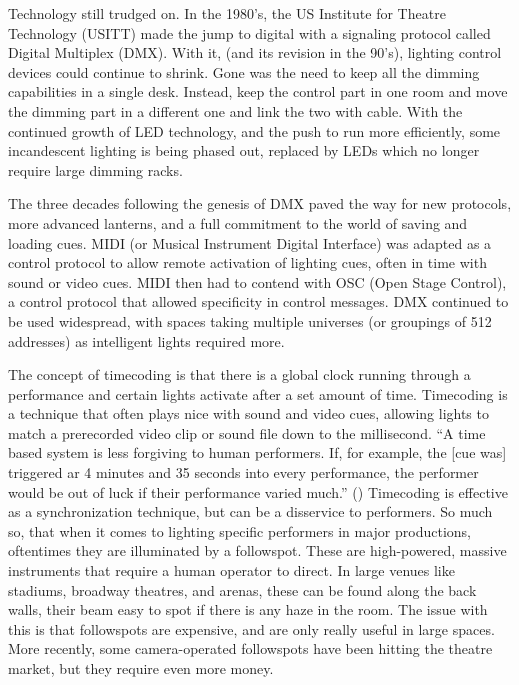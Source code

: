 \documentclass[
    12pt,
    twoside,
    bibstyle=chicago,
    headerstyle=uppercase,
	bibfile=thesis.bib
]{reedthesis}
\begin{document}
Technology still trudged on. In the 1980's, the US Institute for Theatre Technology (USITT) made the jump to digital with a signaling protocol called Digital Multiplex (DMX). With it, (and its revision in the 90's), lighting control devices could continue to shrink. Gone was the need to keep all the dimming capabilities in a single desk. Instead, keep the control part in one room and move the dimming part in a different one and link the two with cable. With the continued growth of LED technology, and the push to run more efficiently, some incandescent lighting is being phased out, replaced by LEDs which no longer require large dimming racks. 

	The three decades following the genesis of DMX paved the way for new protocols, more advanced lanterns, and a full commitment to the world of saving and loading cues. MIDI (or Musical Instrument Digital Interface) was adapted as a control protocol to allow remote activation of lighting cues, often in time with sound or video cues. MIDI then had to contend with OSC (Open Stage Control), a control protocol that allowed specificity in control messages. DMX continued to be used widespread, with spaces taking multiple universes (or groupings of 512 addresses) as intelligent lights required more.
	 
	The concept of timecoding is that there is a global clock running through a performance and certain lights activate after a set amount of time. Timecoding is a technique that often plays nice with sound and video cues, allowing lights to match a prerecorded video clip or sound file down to the millisecond. “A time based system is less forgiving to human performers. If, for example, the [cue was] triggered ar 4 minutes and 35 seconds into every performance, the performer would be out of luck if their performance varied much.” (\autocite{huntington_introduction_2023}) Timecoding is effective as a synchronization technique, but can be a disservice to performers. So much so, that when it comes to lighting specific performers in major productions, oftentimes they are illuminated by a followspot. These are high-powered, massive instruments that require a human operator to direct. In large venues like stadiums, broadway theatres, and arenas, these can be found along the back walls, their beam easy to spot if there is any haze in the room. The issue with this is that followspots are expensive, and are only really useful in large spaces. More recently, some camera-operated followspots have been hitting the theatre market, but they require even more money.
	
\end{document}
